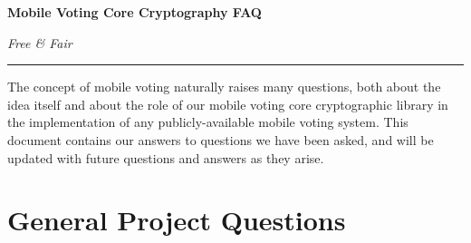 \documentclass[12pt,letter]{article}
\begin{document}
\begin{center}
{\Large \textbf{Mobile Voting Core Cryptography FAQ}}
\end{center}
\vspace{-6pt}

\textit{Free \& Fair} \hspace{\fill} \textit{\DTMtoday}

\vspace{-12pt}

\rule{\textwidth}{1pt}

The concept of mobile voting naturally raises many questions, both about the idea itself and about the role of our mobile voting core cryptographic library in the implementation of any publicly-available mobile voting system. This document contains our answers to questions we have been asked, and will be updated with future questions and answers as they arise.


\section{General Project Questions}
\end{document}
